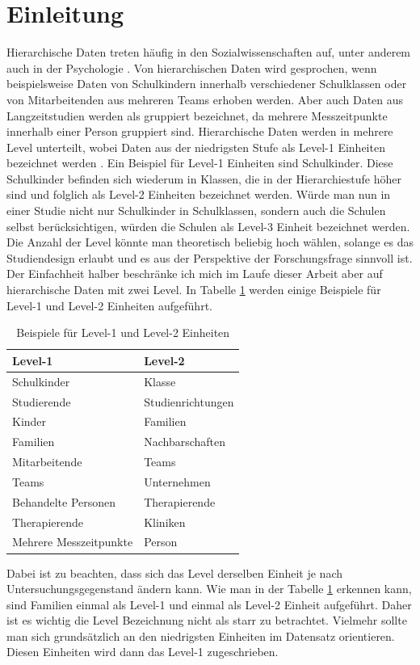 \documentclass[12pt]{article}\usepackage[]{graphicx}\usepackage[]{color}
\begin{document}
\newpage

\section{Einleitung}
Hierarchische Daten treten häufig in den Sozialwissenschaften auf, unter anderem auch in der Psychologie \citep{SnijdersTomA.B2012Ma:a}. Von hierarchischen Daten wird gesprochen, wenn beispielsweise Daten von Schulkindern innerhalb verschiedener Schulklassen oder von Mitarbeitenden aus mehreren Teams erhoben werden. Aber auch Daten aus Langzeitstudien werden als gruppiert bezeichnet, da mehrere Messzeitpunkte innerhalb einer Person gruppiert sind. Hierarchische Daten werden in mehrere Level unterteilt, wobei Daten aus der niedrigsten Stufe als Level-1 Einheiten bezeichnet werden \citep{SnijdersTomA.B2012Ma:a}. Ein Beispiel für Level-1 Einheiten sind Schulkinder. Diese Schulkinder befinden sich wiederum in Klassen, die in der Hierarchiestufe höher sind und folglich als Level-2 Einheiten bezeichnet werden. Würde man nun in einer Studie nicht nur Schulkinder in Schulklassen, sondern auch  die Schulen selbst berücksichtigen, würden die Schulen als Level-3 Einheit bezeichnet werden. Die Anzahl der Level könnte man theoretisch beliebig hoch wählen, solange es das Studiendesign erlaubt und es aus der Perspektive der Forschungsfrage sinnvoll ist. Der Einfachheit halber beschränke ich mich im Laufe dieser Arbeit aber auf hierarchische Daten mit zwei Level. In Tabelle \ref{tab:beispiele_levels} werden einige Beispiele für Level-1 und Level-2 Einheiten aufgeführt. 
\begin{table}[b!]
\centering
\begin{threeparttable}
\caption{Beispiele für Level-1 und Level-2 Einheiten}
\begin{tabular}{ll}
\toprule
Level-1 				& Level-2 	\\
\midrule
Schulkinder 			& Klasse 	\\
Studierende 			& Studienrichtungen \\
Kinder 					& Familien 	\\
Familien 				& Nachbarschaften \\
Mitarbeitende			& Teams \\
Teams					& Unternehmen \\
Behandelte Personen	 	& Therapierende \\
Therapierende 			& Kliniken \\
Mehrere Messzeitpunkte 	& Person \\
\bottomrule
\end{tabular}
\label{tab:beispiele_levels}
\end{threeparttable}
\end{table}
Dabei ist zu beachten, dass sich das Level derselben Einheit je nach Untersuchungsgegenstand ändern kann. Wie man in der Tabelle \ref{tab:beispiele_levels} erkennen kann, sind Familien einmal als Level-1 und einmal als Level-2 Einheit aufgeführt. Daher ist es wichtig die Level Bezeichnung nicht als starr zu betrachtet. Vielmehr sollte man sich grundsätzlich an den niedrigsten Einheiten im Datensatz orientieren. Diesen Einheiten wird dann das Level-1 zugeschrieben.
\end{document}

